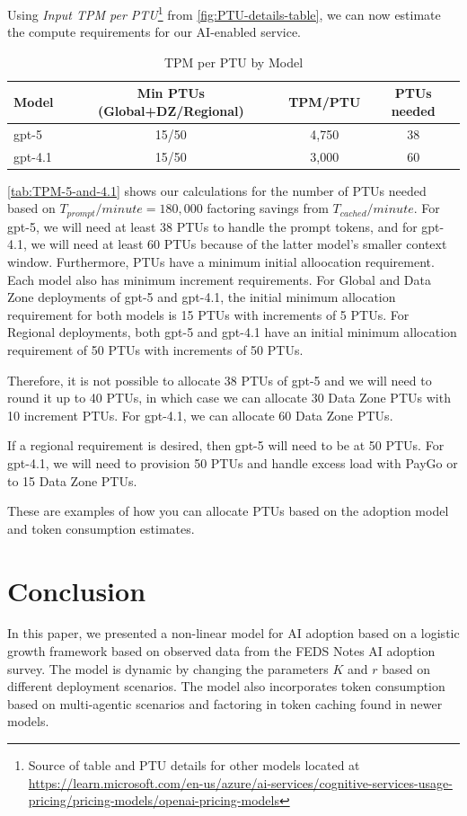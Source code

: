 \documentclass[10pt,twocolumn]{article}
\begin{document}
Using \emph{Input TPM per PTU}\footnote{Source of table and PTU details for other models located at \url{https://learn.microsoft.com/en-us/azure/ai-services/cognitive-services-usage-pricing/pricing-models/openai-pricing-models}}
from \autoref{fig:PTU-details-table}, we can now estimate the compute requirements for our AI-enabled service.

\begin{table}[ht]
\scriptsize
\setlength{\tabcolsep}{4pt}
\renewcommand{\arraystretch}{1.1}
\centering
\begin{tabularx}{\columnwidth}{ l c c c}
\hline
\textbf{Model} & \textbf{Min PTUs (Global+DZ/Regional)} & \textbf{TPM/PTU} & \textbf{PTUs needed} \\
\hline
gpt-5   & 15/50 & 4{,}750 & 38 \\
gpt-4.1 & 15/50 & 3{,}000 & 60 \\
\hline
\end{tabularx}
\caption{TPM per PTU by Model}
\label{tab:TPM-5-and-4.1}
\end{table}

\autoref{tab:TPM-5-and-4.1} shows our calculations for the number of PTUs needed based on $T_{prompt}/minute = 180,000$ factoring savings from $T_{cached}/minute$.
For gpt-5, we will need at least 38 PTUs to handle the prompt tokens, and for gpt-4.1, we will need at least 60 PTUs because of the latter model's smaller context window.
Furthermore, PTUs have a minimum initial alloocation requirement. Each model also has minimum increment requirements. For Global and Data Zone deployments of gpt-5 and gpt-4.1,
the initial minimum allocation requirement for both models is 15 PTUs with increments of 5 PTUs. 
For Regional deployments, both gpt-5 and gpt-4.1 have an initial minimum allocation requirement of 50 PTUs with increments of 50 PTUs.

Therefore, it is not possible to allocate 38 PTUs of gpt-5 and we will need to round it up to 40 PTUs, in which case
we can allocate 30 Data Zone PTUs with 10 increment PTUs. For gpt-4.1, we can allocate 60 Data Zone PTUs.

If a regional requirement is desired, then gpt-5 will need to be at 50 PTUs. For gpt-4.1, we will need to provision 50 PTUs
and handle excess load with PayGo or to 15 Data Zone PTUs.

These are examples of how you can allocate PTUs based on the adoption model and token consumption estimates.

\section{Conclusion}
In this paper, we presented a non-linear model for AI adoption based on a logistic growth framework based on observed data from the FEDS Notes AI adoption survey.
The model is dynamic by changing the parameters $K$ and $r$ based on different deployment scenarios. The model also
incorporates token consumption based on multi-agentic scenarios and factoring in token caching found in newer models.




\end{document}
